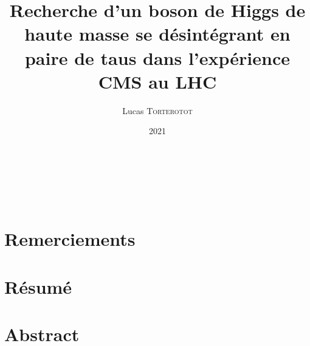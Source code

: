 \documentclass[11pt,a4paper,twoside]{book}
\institute[UCBL]{Université Claude Bernard Lyon 1} %
\title{Recherche d'un boson de Higgs de haute masse se désintégrant en paire de taus dans l'expérience CMS au LHC}
\author[L. \textsc{Torterotot}]{Lucas \textsc{Torterotot}}
\date{\todo{XX xxxx} 2021}
\begin{document}
\pagestyle{empty}

\cleardoublepage
~\vfill
\begin{flushright}
\end{flushright}
\vfill\vfill~
\cleardoublepage
\chapter*{Remerciements}\thispagestyle{empty}\pagestyle{empty}

\cleardoublepage
\chapter*{Résumé}\thispagestyle{empty}\pagestyle{empty}

\chapter*{Abstract}\thispagestyle{empty}\pagestyle{empty}

\cleardoublepage
\frontmatter
\tableofcontents

\mainmatter


\appendix

\backmatter
\printbibliography
\end{document}
